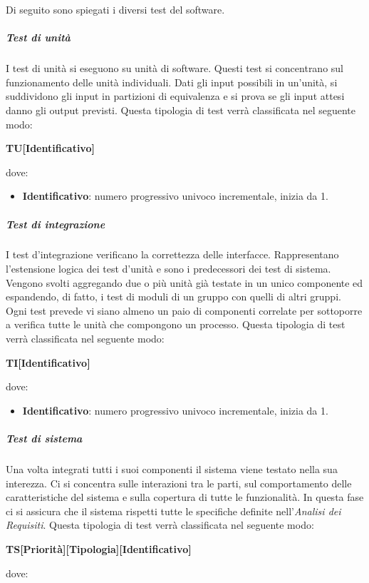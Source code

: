 			Di seguito sono spiegati i diversi test del software.
			\subparagraph{Test di unità}
			I test di unità si eseguono su unità di software. Questi test si concentrano sul funzionamento delle unità individuali. Dati gli input possibili in un'unità, si suddividono gli input in partizioni di equivalenza e si prova se gli input attesi danno gli output previsti.
			Questa tipologia di test verrà classificata nel seguente modo:
			\begin{center}
				\textbf{TU[Identificativo]}
			\end{center}
			dove:
			\begin{itemize}
				\item \textbf{Identificativo}: numero progressivo univoco incrementale, inizia da 1.
			\end{itemize}
			\subparagraph{Test di integrazione}
			I test d’integrazione verificano la correttezza delle interfacce. Rappresentano l’estensione logica dei test d’unità e sono i predecessori dei test di sistema. Vengono svolti aggregando due o più unità già testate in un unico componente ed espandendo, di fatto, i test di moduli di un gruppo con quelli di altri gruppi. Ogni test prevede vi siano almeno un paio di componenti correlate per sottoporre a verifica tutte le unità che compongono un processo.
			Questa tipologia di test verrà classificata nel seguente modo:
			\begin{center}
				\textbf{TI[Identificativo]}
			\end{center}
			dove:
			\begin{itemize}
				\item \textbf{Identificativo}: numero progressivo univoco incrementale, inizia da 1.
			\end{itemize}
			\subparagraph{Test di sistema}
			Una volta integrati tutti i suoi componenti il sistema viene testato nella sua interezza. Ci si concentra sulle interazioni tra le parti, sul comportamento delle caratteristiche del sistema e sulla copertura di tutte le funzionalità. In questa fase ci si assicura che il sistema rispetti tutte le specifiche definite nell'\textit{Analisi dei Requisiti}.
			Questa tipologia di test verrà classificata nel seguente modo:
			\begin{center}
				\textbf{TS[Priorità][Tipologia][Identificativo]}
			\end{center}
			dove:
